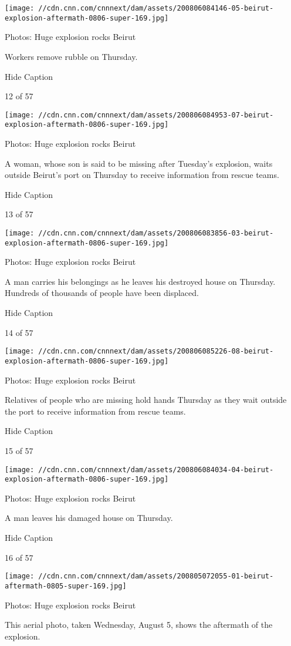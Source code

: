 \texttt{[image: //cdn.cnn.com/cnnnext/dam/assets/200806084146-05-beirut-explosion-aftermath-0806-super-169.jpg]}

Photos: Huge explosion rocks Beirut

Workers remove rubble on Thursday.

Hide Caption

12 of 57

\texttt{[image: //cdn.cnn.com/cnnnext/dam/assets/200806084953-07-beirut-explosion-aftermath-0806-super-169.jpg]}

Photos: Huge explosion rocks Beirut

A woman, whose son is said to be missing after Tuesday's explosion,
waits outside Beirut's port on Thursday to receive information from
rescue teams.

Hide Caption

13 of 57

\texttt{[image: //cdn.cnn.com/cnnnext/dam/assets/200806083856-03-beirut-explosion-aftermath-0806-super-169.jpg]}

Photos: Huge explosion rocks Beirut

A man carries his belongings as he leaves his destroyed house on
Thursday. Hundreds of thousands of people have been displaced.

Hide Caption

14 of 57

\texttt{[image: //cdn.cnn.com/cnnnext/dam/assets/200806085226-08-beirut-explosion-aftermath-0806-super-169.jpg]}

Photos: Huge explosion rocks Beirut

Relatives of people who are missing hold hands Thursday as they wait
outside the port to receive information from rescue teams.

Hide Caption

15 of 57

\texttt{[image: //cdn.cnn.com/cnnnext/dam/assets/200806084034-04-beirut-explosion-aftermath-0806-super-169.jpg]}

Photos: Huge explosion rocks Beirut

A man leaves his damaged house on Thursday.

Hide Caption

16 of 57

\texttt{[image: //cdn.cnn.com/cnnnext/dam/assets/200805072055-01-beirut-aftermath-0805-super-169.jpg]}

Photos: Huge explosion rocks Beirut

This aerial photo, taken Wednesday, August 5, shows the aftermath of the
explosion.

